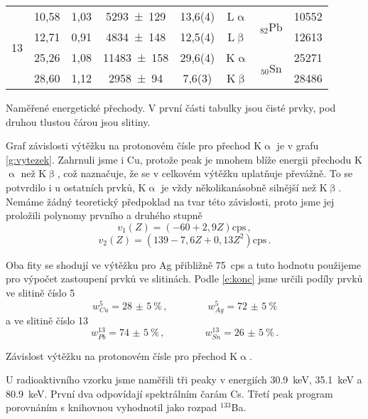 \begin{tabulka}[htbp]
\begin{tabular}{c|ccccc|cc}
\multirow{4}{*}{13} & 10,58 & 1,03 & \num{5293(129)} & 13,6(4) & L$\upalpha$ & \multirow{2}{*}{$_{82}$Pb} & \num{10552} \\ 
 & 12,71 & 0,91 & \num{4834(148)} & 12,5(4) & L$\upbeta$ &  & \num{12613}\\
 & 25,26 & 1,08 & \num{11483(158)} & 29,6(4) & K$\upalpha$ & \multirow{2}{*}{$_{50}$Sn} & \num{25271}\\
 & 28,60 & 1,12 & \num{2958(94)} & 7,6(3) & K$\upbeta$ &  & \num{28486}\\
\end{tabular}
\caption{Naměřené energetické přechody. V první části tabulky jsou čisté prvky, pod druhou tlustou čárou jsou slitiny.}
\label{t:merenivzorky}
\end{tabulka}

Graf závislosti výtěžku na protonovém čísle pro přechod K$\upalpha$ je v grafu \ref{g:vytezek}. Zahrnuli jsme i Cu, protože peak je mnohem blíže energii přechodu K$\upalpha$ než K$\upbeta$, což naznačuje, že se v celkovém výtěžku uplatňuje převážně. To se potvrdilo i u ostatních prvků, K$\upalpha$ je vždy několikanásobně silnější než K$\upbeta$.
Nemáme žádný teoretický předpoklad na tvar této závislosti, proto jsme jej proložili polynomy prvního a druhého stupně
\begin{equation}
v_1(Z)=(-60+2,9Z)\text{cps} \,,
\end{equation}
\begin{equation}
v_2(Z)=(139-7,6Z+0,13Z^2)\text{cps} \,.
\end{equation}

Oba fity se shodují ve výtěžku pro Ag přibližně \SI{75}{cps} a tuto hodnotu použijeme pro výpočet zastoupení prvků ve slitinách.
Podle \eqref{e:konc} jsme určili podíly prvků ve slitině číslo 5
\begin{equation}
w_{Cu}^5=\SI{28(5)}{\percent} \,,\qquad \qquad w_{Ag}^5=\SI{72(5)}{\percent}
\end{equation}
a ve slitině číslo 13
\begin{equation}
w_{Pb}^{13}=\SI{74(5)}{\percent} \,,\qquad \qquad w_{Sn}^{13}=\SI{26(5)}{\percent} \,.
\end{equation}

\begin{graph}[htbp] 
\centering

\caption{Závislost výtěžku na protonovém čísle pro přechod K$\upalpha$.}
\label{g:vytezek}
\end{graph}

U radioaktivního vzorku jsme naměřili tři peaky v energiích \SI{30.9}{\keV}, \SI{35.1}{\keV} a \SI{80.9}{\keV}. První dva odpovídají spektrálním čarám Cs. Třetí peak program porovnáním s knihovnou vyhodnotil jako rozpad $^{133}$Ba.